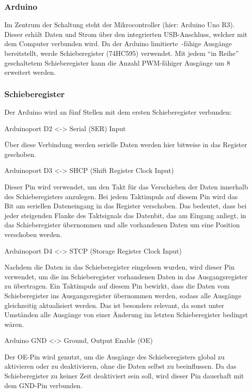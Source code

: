 \subsubsection{Arduino}

Im Zentrum der Schaltung steht der Mikrocontroller (hier: Arduino Uno R3).
Dieser erhält Daten und Strom über den integrierten USB-Anschluss, welcher mit dem Computer verbunden wird.
Da der Arduino limitierte~-fähige Ausgänge bereitstellt, werde Schieberegister (74HC595) verwendet.
Mit jedem ``in Reihe'' geschaltetem Schieberegister kann die Anzahl PWM-fähiger Ausgänge um 8 erweitert werden.

\subsubsection{Schieberegister}

Der Arduino wird an fünf Stellen mit dem ersten Schieberegister verbunden:

Arduinoport D2 <-> Serial (SER) Input

Über diese Verbindung werden serielle Daten werden hier bitweise in das Register geschoben.

Arduinoport D3 <-> SHCP (Shift Register Clock Input)

Dieser Pin wird verwendet, um den Takt für das Verschieben der Daten innerhalb des Schieberegisters anzulegen.
Bei jedem Taktimpuls auf diesem Pin wird das Bit am seriellen Dateneingang in das Register verschoben.
Das bedeutet, dass bei jeder steigenden Flanke des Taktsignals das Datenbit, das am Eingang anliegt, in das Schieberegister übernommen und alle vorhandenen Daten um eine Position verschoben werden.

Arduinoport D4 <-> STCP (Storage Register Clock Input)

Nachdem die Daten in das Schieberegister eingelesen wurden, wird dieser Pin verwendet, um die im Schieberegister vorhandenen Daten in das Ausgangsregister zu übertragen.
Ein Taktimpuls auf diesem Pin bewirkt, dass die Daten vom Schieberegister ins Ausgangsregister übernommen werden, sodass alle Ausgänge gleichzeitig aktualisiert werden.
Das ist besonders relevant, da sonst unter Umständen alle Ausgänge von einer Änderung im letzten Schieberegister bedingst wären.

Arduino GND <-> Ground, Output Enable (OE)

Der OE-Pin wird genutzt, um die Ausgänge des Schieberegisters global zu aktivieren oder zu deaktivieren, ohne die Daten selbst zu beeinflussen.
Da das Schieberegister zu keiner Zeit deaktiviert sein soll, wird dieser Pin dauerhaft mit dem GND-Pin verbunden.

